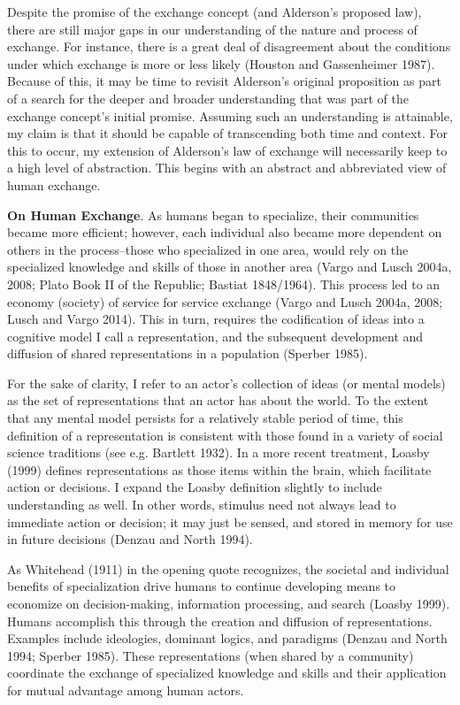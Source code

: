 Despite the promise of the exchange concept (and Alderson's proposed law), there are still major gaps in our understanding of the nature and process of exchange. For instance, there is a great deal of disagreement about the conditions under which exchange is more or less likely (Houston and Gassenheimer 1987). Because of this, it may be time to revisit Alderson's original proposition as part of a search for the deeper and broader understanding that was part of the exchange concept's initial promise. Assuming such an understanding is attainable, my claim is that it should be capable of transcending both time and context. For this to occur, my extension of Alderson's law of exchange will necessarily keep to a high level of abstraction. This begins with an abstract and abbreviated view of human exchange. 

\textbf{On Human Exchange}.
As humans began to specialize, their communities became more efficient; however, each individual also became more dependent on others in the process--those who specialized in one area, would rely on the specialized knowledge and skills of those in another area (Vargo and Lusch 2004a, 2008; Plato Book II of the Republic; Bastiat 1848/1964). This process led to an economy (society) of service for service exchange (Vargo and Lusch 2004a, 2008; Lusch and Vargo 2014). This in turn, requires the codification of ideas into a cognitive model I call a representation, and the subsequent development and diffusion of shared representations in a population (Sperber 1985). 

For the sake of clarity, I refer to an actor's collection of ideas (or mental models) as the set of representations that an actor has about the world. To the extent that any mental model persists for a relatively stable period of time, this definition of a representation is consistent with those found in a variety of social science traditions (see e.g. Bartlett 1932). In a more recent treatment, Loasby (1999) defines representations as those items within the brain, which facilitate action or decisions. I expand the Loasby definition slightly to include understanding as well. In other words, stimulus need not always lead to immediate action or decision; it may just be sensed, and stored in memory for use in future decisions (Denzau and North 1994). 

As Whitehead (1911) in the opening quote recognizes, the societal and individual benefits of specialization drive humans to continue developing means to economize on decision-making, information processing, and search (Loasby 1999). Humans accomplish this through the creation and diffusion of representations. Examples include ideologies, dominant logics, and paradigms (Denzau and North 1994; Sperber 1985). These representations (when shared by a community) coordinate the exchange of specialized knowledge and skills and their application for mutual advantage among human actors. 

